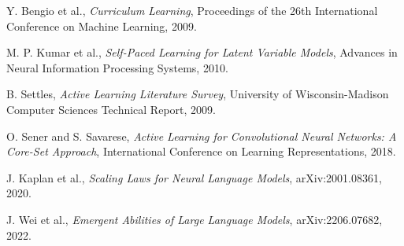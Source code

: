 \documentclass[12pt]{article}
\begin{document}
\begin{thebibliography}{9}
Y. Bengio et al.,
\textit{Curriculum Learning},
Proceedings of the 26th International Conference on Machine Learning, 2009.

M. P. Kumar et al.,
\textit{Self-Paced Learning for Latent Variable Models},
Advances in Neural Information Processing Systems, 2010.

B. Settles,
\textit{Active Learning Literature Survey},
University of Wisconsin-Madison Computer Sciences Technical Report, 2009.

O. Sener and S. Savarese,
\textit{Active Learning for Convolutional Neural Networks: A Core-Set Approach},
International Conference on Learning Representations, 2018.

J. Kaplan et al.,
\textit{Scaling Laws for Neural Language Models},
arXiv:2001.08361, 2020.

J. Wei et al.,
\textit{Emergent Abilities of Large Language Models},
arXiv:2206.07682, 2022.
\end{thebibliography}
\end{document}
